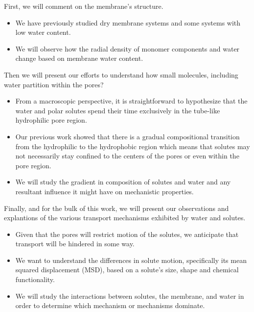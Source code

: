 \documentclass{article}
\begin{document}
  
  First, we will comment on the membrane's structure.
  \begin{itemize}
    \item We have previously studied dry membrane systems and some systems with
    low water content.
    \item We will observe how the radial density of monomer components and water
    change based on membrane water content.
  \end{itemize}
  
  Then we will present our efforts to understand how small molecules, including water
  partition within the pores?
  \begin{itemize}
    \item From a macroscopic perspective, it is straightforward to hypothesize that 
    the water and polar solutes spend their time exclusively in the tube-like hydrophilic
    pore region.
    \item Our previous work showed that there is a gradual compositional transition 
    from the hydrophilic to the hydrophobic region which means that solutes may not 
    necessarily stay confined to the centers of the pores or even within the
    pore region. 
    \item We will study the gradient in composition of solutes and water and any 
    resultant influence it might have on mechanistic properties.
  \end{itemize}
  
  Finally, and for the bulk of this work, we will present our observations and explantions
  of the various transport mechanisms exhibited by water and solutes.
  \begin{itemize}
    \item Given that the pores will restrict motion of the solutes, we anticipate that 
    transport will be hindered in some way. 
    \item We want to understand the differences in solute motion, specifically its mean
    squared displacement (MSD), based on a solute's size, shape and chemical functionality.
    \item We will study the interactions between solutes, the membrane, and water in order
    to determine which mechanism or mechanisms dominate.
  \end{itemize}
  
\end{document}
